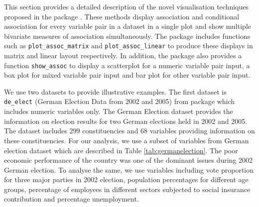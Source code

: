 This section provides a detailed description of the novel visualisation
techniques proposed in the package . These methods
display association and conditional association for every variable pair
in a dataset in a single plot and show multiple bivariate measures of
association simultaneously. The package includes functions such as
\texttt{plot\_assoc\_matrix} and \texttt{plot\_assoc\_linear} to produce
these displays in matrix and linear layout respectively. In addition,
the package also provides a function \texttt{show\_assoc} to display a
scatterplot for a numeric variable pair input, a box plot for mixed
variable pair input and bar plot for other variable pair input.

We use two datasets to provide illustrative examples. The first dataset
is \texttt{de\_elect} (German Election Data from 2002 and 2005) from
 package which includes numeric variables only. The
German Election dataset provides the information on election results for
two German elections held in 2002 and 2005. The dataset includes \(299\)
constituencies and \(68\) variables providing information on these
constituencies. For our analysis, we use a subset of variables from
German election dataset which are described in Table
\ref{tab:germanelection}. The poor economic performance of the country
was one of the dominant issues during 2002 German election. To analyse
the same, we use variables including vote proportion for three major
parties in 2002 election, population percentages for different age
groups, percentage of employees in different sectors subjected to social
insurance contribution and percentage unemployment.

